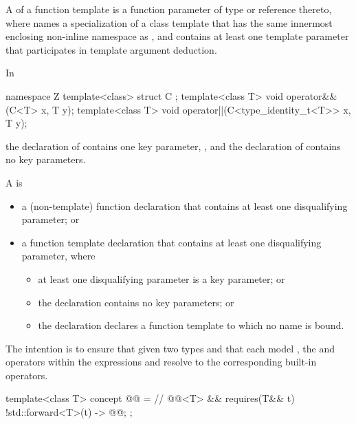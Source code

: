 \pnum
{}%
A  of a function template 
is a function parameter of type \cv{}  or reference thereto,
where  names a specialization of a class template that
has the same innermost enclosing non-inline namespace as , and
 contains at least one template parameter that
participates in template argument deduction.
\begin{example}
In
\begin{codeblock}
namespace Z {
  template<class> struct C {};
  template<class T>
    void operator&&(C<T> x, T y);
  template<class T>
    void operator||(C<type_identity_t<T>> x, T y);
}
\end{codeblock}
the declaration of 
contains one key parameter, , and
the declaration of 
contains no key parameters.
\end{example}

\pnum
A  is

\begin{itemize}
\item
a (non-template) function declaration that
contains at least one disqualifying parameter; or

\item
a function template declaration that
contains at least one disqualifying parameter, where
\begin{itemize}
\item at least one disqualifying parameter is a key parameter; or
\item the declaration contains no key parameters; or
\item the declaration declares a function template
to which no name is bound.
\end{itemize}
\end{itemize}

\pnum
\begin{note}
The intention is to ensure that
given two types  and 
that each model ,
the \tcode{\&\&} and \tcode{||} operators within the expressions
 and
resolve to the corresponding built-in operators.
\end{note}

\begin{itemdecl}
template<class T>
  concept @@ =                // \expos
    @@<T> && requires(T&& t) {
      { !std::forward<T>(t) } -> @@;
    };
\end{itemdecl}

